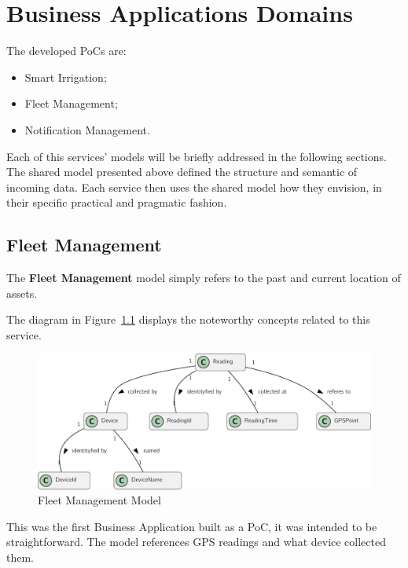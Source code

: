 
\chapter{Business Applications Domains}
\label{appendix:design:domain:services_contexts}

The developed \gls{PoC}s are:

\begin{itemize}
      \item Smart Irrigation;
      \item Fleet Management;
      \item Notification Management.
\end{itemize}

Each of this services' models will be briefly addressed in the following sections. The shared model presented above defined the structure and semantic of incoming data. Each service then uses the shared model how they envision, in their specific practical and pragmatic fashion.

\section{Fleet Management}
\label{subsubsec:design:domain:bounded_contexts:fleet}

The \textbf{Fleet Management} model simply refers to the past and current location of assets.

The diagram in Figure~\ref{fig:design:domain:bounded_contexts:fleet:diagram} displays the noteworthy concepts related to this service.

\begin{figure}[H]
   \centering
   \includegraphics[page=1,width=\columnwidth]{assets/diagrams/design/domain/fleet-management-model.pdf}
  \caption[Fleet Management Model]{Fleet Management Model}
  \label{fig:design:domain:bounded_contexts:fleet:diagram}
\end{figure}

This was the first Business Application built as a \gls{PoC}, it was intended to be straightforward. The model references \gls{GPS} readings and what device collected them.

